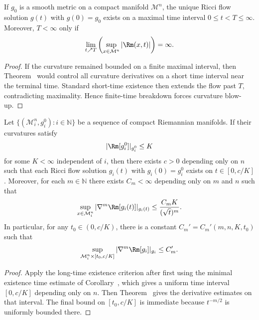\begin{corollary}
\label{ch07-cor-long-time-existence}

If \(g_0\) is a smooth metric on a compact manifold \(\mathcal M^n\), the unique Ricci flow solution \(g(t)\) with \(g(0)=g_0\) exists on a maximal time interval \(0\le t<T\le \infty\). Moreover, \(T<\infty\) only if
\[
\lim_{t\nearrow T}\left(\sup_{x\in \mathcal M^n}|\Rm(x,t)|\right)=\infty.
\]
\end{corollary}

\begin{proof}
\sketch If the curvature remained bounded on a finite maximal interval, then Theorem~ would control all curvature derivatives on a short time interval near the terminal time. Standard short-time existence then extends the flow past \(T\), contradicting maximality. Hence finite-time breakdown forces curvature blow-up.
\end{proof}

\begin{corollary}
\label{ch07-cor-uniform-bounds-sequences}

Let \(\{(\mathcal M_i^n,g_i^0):i\in\mathbb N\}\) be a sequence of compact Riemannian manifolds. If their curvatures satisfy
\[
|\Rm[g_i^0]|_{g_i^0}\le K
\]
for some \(K<\infty\) independent of \(i\), then there exists \(c>0\) depending only on \(n\) such that each Ricci flow solution \(g_i(t)\) with \(g_i(0)=g_i^0\) exists on \(t\in[0,c/K]\). Moreover, for each \(m\in\mathbb N\) there exists \(C_m<\infty\) depending only on \(m\) and \(n\) such that
\[
\sup_{x\in \mathcal M_i^n}|\nabla^m\Rm[g_i(t)]|_{g_i(t)}\le \frac{C_mK}{(\sqrt t)^m}.
\]
In particular, for any \(t_0\in(0,c/K)\), there is a constant \(C_m'=C_m'(m,n,K,t_0)\) such that
\[
\sup_{\mathcal M_i^n\times[t_0,c/K]}|\nabla^m\Rm[g_i]|_{g_i}\le C_m'.
\]
\end{corollary}

\begin{proof}
\sketch Apply the long-time existence criterion after first using the minimal existence time estimate of Corollary~, which gives a uniform time interval \([0,c/K]\) depending only on \(n\). Then Theorem~ gives the derivative estimates on that interval. The final bound on \([t_0,c/K]\) is immediate because \(t^{-m/2}\) is uniformly bounded there.
\end{proof}


